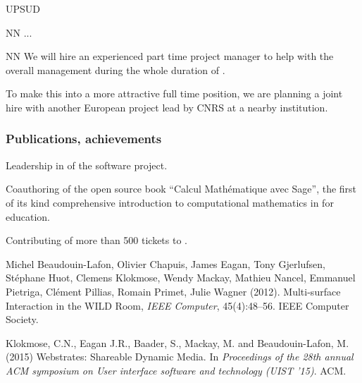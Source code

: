 \begin{sitedescription}{UPSUD}


\begin{participant}[type=res,PM=24,salary=4650]{NN}
...
\end{participant}

\begin{participant}[type=res,PM=24,salary=3932]{NN}
  We will hire an experienced part time project manager to help with
  the overall management during the whole duration of \TheProject.

  To make this into a more attractive full time position, we are
  planning a joint hire with another European project lead by CNRS at
  a nearby institution.
\end{participant}


\subsubsection*{Publications, achievements}

\begin{compactenum}
\item Leadership in of the \SageCombinat software project.
\item Coauthoring of the open source book ``Calcul Mathématique avec
  Sage'', the first of its kind comprehensive introduction to
  computational mathematics in \Sage for education.
\item Contributing of more than 500 tickets to \Sage.
\end{compactenum}

\begin{compactenum}
\item
Michel Beaudouin-Lafon, Olivier Chapuis, James Eagan, Tony Gjerlufsen, Stéphane Huot, Clemens Klokmose, Wendy Mackay, Mathieu Nancel, Emmanuel Pietriga, Clément Pillias, Romain Primet, Julie Wagner (2012). Multi-surface Interaction in the WILD Room, \emph{IEEE Computer}, 45(4):48–56. IEEE Computer Society.
\item
Klokmose, C.N., Eagan J.R., Baader, S., Mackay, M. and Beaudouin-Lafon, M. (2015) Webstrates: Shareable Dynamic Media. In \emph{Proceedings of the 28th annual ACM symposium on User interface software and technology (UIST ’15)}. ACM.
\end{compactenum}


\end{sitedescription}
